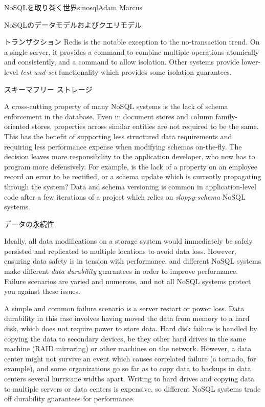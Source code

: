 \begin{aosachapter}{NoSQLを取り巻く世界}{s:nosql}{Adam Marcus}
\begin{aosasect1}{NoSQLのデータモデルおよびクエリモデル}
\begin{aosasect2}{トランザクション}
Redis is the notable exception to the no-transaction trend.  On a
single server, it provides a  command to combine multiple
operations atomically and consistently, and a  command to
allow isolation.  Other systems provide lower-level
\emph{test-and-set} functionality which provides some isolation
guarantees.

\end{aosasect2}

\begin{aosasect2}{スキーマフリー ストレージ}

A cross-cutting property of many NoSQL systems is the lack of schema
enforcement in the database.  Even in document stores and column
family-oriented stores, properties across similar entities are not
required to be the same.  This has the benefit of supporting less
structured data requirements and requiring less performance expense
when modifying schemas on-the-fly.  The decision leaves more
responsibility to the application developer, who now has to program
more defensively.  For example, is the lack of a 
property on an employee record an error to be rectified, or a schema
update which is currently propagating through the system?  Data and
schema versioning is common in application-level code after a few
iterations of a project which relies on \emph{sloppy-schema} NoSQL
systems.

\end{aosasect2}

\end{aosasect1}

\begin{aosasect1}{データの永続性}

Ideally, all data modifications on a storage system would immediately
be safely persisted and replicated to multiple locations to avoid data
loss.  However, ensuring data safety is in tension with performance,
and different NoSQL systems make different \emph{data durability}
guarantees in order to improve performance.  Failure scenarios are
varied and numerous, and not all NoSQL systems protect you against
these issues.

A simple and common failure scenario is a server restart or power
loss.  Data durability in this case involves having moved the data
from memory to a hard disk, which does not require power to store
data.  Hard disk failure is handled by copying the data to secondary
devices, be they other hard drives in the same machine (RAID
mirroring) or other machines on the network.  However, a data center
might not survive an event which causes correlated failure (a tornado, for example), and some
organizations go so far as to copy data to backups in data centers
several hurricane widths apart. Writing to hard drives and copying
data to multiple servers or data centers is expensive, so different
NoSQL systems trade off durability guarantees for performance.


\end{aosasect1}
\end{aosachapter}
